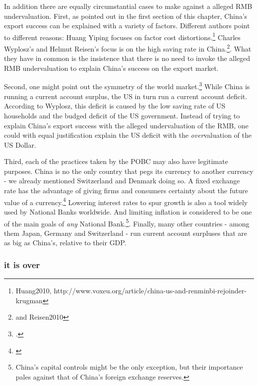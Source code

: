 In addition there are equally circumstantial cases to make against a alleged RMB undervaluation. First, as pointed out in the first section of this chapter, China's export success can be explained with a variety of factors.  Different authors point to different reasons: Huang Yiping focuses on factor cost distortions.\footnote{Huang2010, http://www.voxeu.org/article/china-us-and-renminbi-rejoinder-krugman} Charles Wyplosz's and Helmut Reisen's focus is on the high saving rate in China.\footnote{\cite[pp. 40]{Wyplosz2010} and \cite{p. 65}{Reisen2010}}. What they have in common is the insistence that there is no need to invoke the alleged RMB undervaluation to explain China's success on the export market.

Second, one might point out the symmetry of the world market.\footnote{\cite[pp. 39-40]{Wyplosz2010}.} While China is running a current account surplus, the US in turn run a current account deficit. According to Wyplosz, this deficit is caused by the low saving rate of US households and the budged deficit of the US government. Instead of trying to explain China's export success with the alleged undervaluation of the RMB, one could with equal justification explain the US deficit with the \emph{over}valuation of the US Dollar. 

Third, each of the practices taken by the POBC may also have legitimate purposes. China is no the only country that pegs its currency to another currency - we already mentioned Switzerland and Denmark doing so. A fixed exchange rate has the advantage of giving firms and consumers certainty about the future value of a currency.\footnote{\cite[p. 515]{Krugman2008}} Lowering interest rates to spur growth is also a tool widely used by National Banks worldwide. And limiting inflation is considered to be one of the main goals of \emph{any} National Bank.\footnote{China's capital controls might be the only exception, but their importance pales against that of China's foreign exchange reserves.}. Finally, many other countries - among them Japan, Germany and Switzerland - run current account surpluses that are as big as China's, relative to their GDP.


\subsubsection{it is over}

